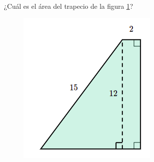 ¿Cuál es el \'area del trapecio de la figura \ref{fig:area_compuesta_03}?

\begin{figure}[H]
    \begin{center}
        \includegraphics[width=0.2\linewidth]{../images/area_compuesta_03.png}
    \end{center}
    \caption{}
    \label{fig:area_compuesta_03}
\end{figure}
\begin{solutionbox}{15cm}


\end{solutionbox}
